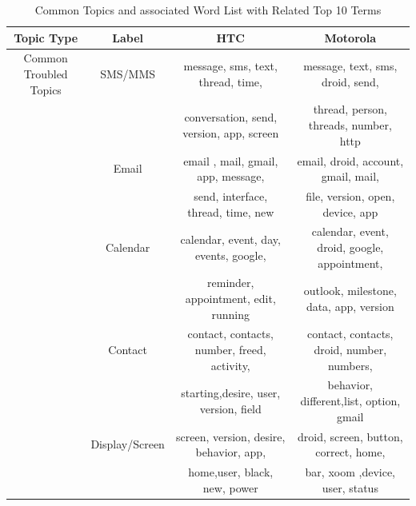 \documentclass[10pt, conference, compsocconf]{IEEEtran}
\begin{document}
\begin{table}[!htb]
\renewcommand{\arraystretch}{1.3}
\caption{Common Topics and associated Word List with Related Top 10 Terms}
\label{topicslist}
\centering
\begin{tabular}{|c||c||c||c|}
\hline
Topic Type & Label & HTC & Motorola\\ 
\hline
Common Troubled Topics & SMS\//MMS &message,	sms,	text, thread, time,  & message, text, sms, droid, send,	\\
&&conversation, send, version, app, screen &thread, person, threads, number, http\\ \cline{2-4}

  & Email & email	, mail, gmail, app, message,   &email, droid, account,	gmail, mail, \\
            &&send, interface, thread, time, new & file, version, open, device, app\\ \cline{2-4}
            
  & Calendar&calendar, event, day, events, google,  &calendar,	event, droid, google, appointment, \\
            &&reminder, appointment,  edit, running &outlook, milestone, data, app, version\\ \cline{2-4}
            
  & Contact & contact, contacts, number, freed, activity,  &contact, contacts, droid, number, numbers, \\
            &&starting,desire, user, version, field & behavior, different,list, option, gmail\\ \cline{2-4}
            
  & Display\//Screen&screen, version, desire,	behavior, app, &droid, screen, button, correct, home, \\
   &&home,user, black, new,	power  &bar, xoom	,device, user, status\\ \cline{2-4}
   

\end{tabular}
\end{table}
\end{document}
